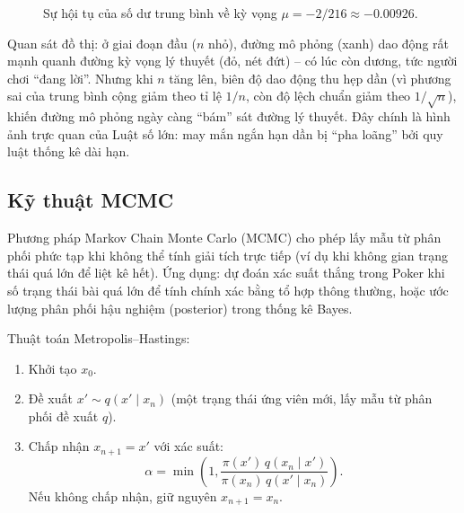 \documentclass[12pt,a4paper]{article}
\theoremstyle{coloredthm}
\theoremstyle{coloreddef}
\theoremstyle{remark}
\begin{document}
\begin{figure}[H]
\centering
{}
\caption{Sự hội tụ của số dư trung bình về kỳ vọng $\mu = -2/216 \approx -0.00926$.}
\end{figure}

\begin{giaithich}
Quan sát đồ thị: ở giai đoạn đầu ($n$ nhỏ), đường mô phỏng (xanh) dao động rất mạnh quanh đường kỳ vọng lý thuyết (đỏ, nét đứt) -- có lúc còn dương, tức người chơi ``đang lời''. Nhưng khi $n$ tăng lên, biên độ dao động thu hẹp dần (vì phương sai của trung bình cộng giảm theo tỉ lệ $1/n$, còn độ lệch chuẩn giảm theo $1/\sqrt{n}$), khiến đường mô phỏng ngày càng ``bám'' sát đường lý thuyết. Đây chính là hình ảnh trực quan của Luật số lớn: may mắn ngắn hạn dần bị ``pha loãng'' bởi quy luật thống kê dài hạn.
\end{giaithich}

\subsection{Kỹ thuật MCMC}

Phương pháp Markov Chain Monte Carlo (MCMC) cho phép lấy mẫu từ phân phối phức tạp khi không thể tính giải tích trực tiếp (ví dụ khi không gian trạng thái quá lớn để liệt kê hết). Ứng dụng: dự đoán xác suất thắng trong Poker khi số trạng thái bài quá lớn để tính chính xác bằng tổ hợp thông thường, hoặc ước lượng phân phối hậu nghiệm (posterior) trong thống kê Bayes.

Thuật toán Metropolis--Hastings:
\begin{enumerate}
    \item Khởi tạo $x_0$.
    \item Đề xuất $x' \sim q(x' \mid x_n)$ (một trạng thái ứng viên mới, lấy mẫu từ phân phối đề xuất $q$).
    \item Chấp nhận $x_{n+1} = x'$ với xác suất:
    \[
    \alpha = \min\!\left(1, \frac{\pi(x')\,q(x_n \mid x')}{\pi(x_n)\,q(x' \mid x_n)}\right).
    \]
    Nếu không chấp nhận, giữ nguyên $x_{n+1} = x_n$.
\end{enumerate}
\end{document}
